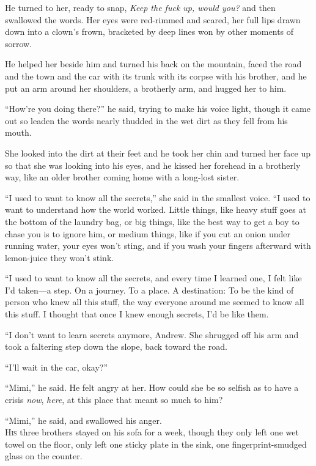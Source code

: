 He turned to her, ready to snap, \textit{Keep the fuck up, would you?}
and then swallowed the words.  Her eyes were red-rimmed and scared,
her full lips drawn down into a clown's frown, bracketed by deep lines
won by other moments of sorrow.

He helped her beside him and turned his back on the mountain, faced
the road and the town and the car with its trunk with its corpse with
his brother, and he put an arm around her shoulders, a brotherly arm,
and hugged her to him.

``How're you doing there?'' he said, trying to make his voice light,
though it came out so leaden the words nearly thudded in the wet dirt
as they fell from his mouth.

She looked into the dirt at their feet and he took her chin and turned
her face up so that she was looking into his eyes, and he kissed her
forehead in a brotherly way, like an older brother coming home with a
long-lost sister.

``I used to want to know all the secrets,'' she said in the smallest
voice.  ``I used to want to understand how the world worked.  Little
things, like heavy stuff goes at the bottom of the laundry bag, or big
things, like the best way to get a boy to chase you is to ignore him,
or medium things, like if you cut an onion under running water, your
eyes won't sting, and if you wash your fingers afterward with
lemon-juice they won't stink.

``I used to want to know all the secrets, and every time I learned
one, I felt like I'd taken---a step.  On a journey.  To a place.  A
destination:  To be the kind of person who knew all this stuff, the
way everyone around me seemed to know all this stuff.  I thought that
once I knew enough secrets, I'd be like them.

``I don't want to learn secrets anymore, Andrew.  She shrugged off his
arm and took a faltering step down the slope, back toward the road.

``I'll wait in the car, okay?''

``Mimi,'' he said.  He felt angry at her.  How could she be so selfish
as to have a crisis \textit{now}, \textit{here}, at this place that
meant so much to him?

``Mimi,'' he said, and swallowed his anger.
\\
\lettrine[lines=3, lhang=.5, nindent=0pt, findent=2pt]{H}{is} three brothers stayed on his sofa for a week, though they only
left one wet towel on the floor, only left one sticky plate in the
sink, one fingerprint-smudged glass on the counter.

